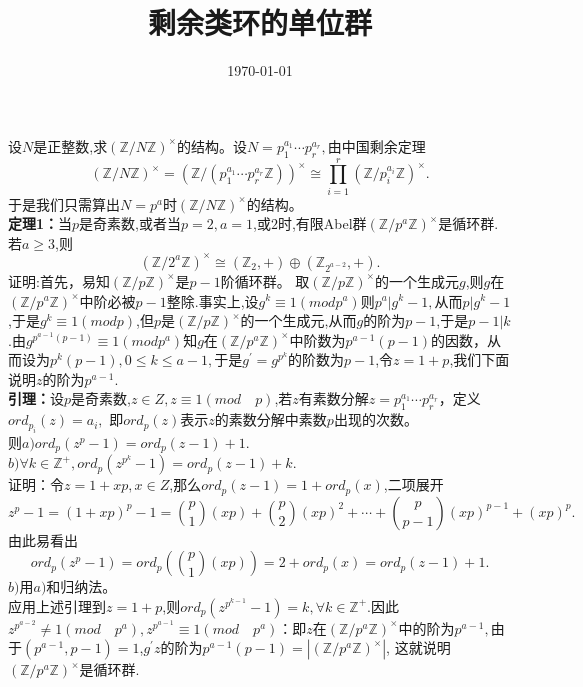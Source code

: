 \documentclass[UTF8]{article}
\title{剩余类环的单位群}
\date{\today }
\begin{document}
 \maketitle
	设$N$是正整数,求$(\mathbb{Z}/N\mathbb{Z})^{\times}$的结构。设$N=p_{1}^{a_{1}}\cdots p_{r}^{a_{r}},$由中国剩余定理
	$$
	(\mathbb{Z}/N\mathbb{Z})^{\times}=(\mathbb{Z}/(p_{1}^{a_{1}}\cdots p_{r}^{a_{r}}\mathbb{Z}))^{\times}\cong \prod_{i=1}^{r}(\mathbb{Z}/p_{i}^{a_{i}}\mathbb{Z})^{\times}.
	$$
	于是我们只需算出$N=p^{a}$时$(\mathbb{Z}/N\mathbb{Z})^{\times}$的结构。\\
	\textbf{定理1：}当$p$是奇素数,或者当$p=2,a=1$,或$2$时,有限Abel群$(\mathbb{Z}/p^{a}\mathbb{Z})^{\times}$是循环群.若$a\geq 3$,则
	$$
	(\mathbb{Z}/2^{a}\mathbb{Z})^{\times}\cong (\mathbb{Z}_{2},+)\oplus (\mathbb{Z}_{2^{a-2}},+).
	$$
	证明:首先，易知$(\mathbb{Z}/p\mathbb{Z})^{\times}$是$p-1$阶循环群。 取$(\mathbb{Z}/p\mathbb{Z})^{\times}$的一个生成元$g$,则$g$在$(\mathbb{Z}/p^{a}\mathbb{Z})^{\times}$中阶必被$p-1$整除.事实上,设$g^{k}\equiv 1(mod p^{a})$则$p^{a}|g^{k}-1,$从而$p|g^{k}-1$,于是$g^{k}\equiv 1(mod p)$,但$p$是$(\mathbb{Z}/p\mathbb{Z})^{\times}$的一个生成元,从而$g$的阶为$p-1$,于是$p-1|k$.由$g^{p^{a-1}(p-1)}\equiv 1(mod p^{a})$知$g$在$(\mathbb{Z}/p^{a}\mathbb{Z})^{\times}$中阶数为$p^{a-1}(p-1)$的因数，从而设为$p^{k}(p-1),0\leq k\leq a-1,$于是$g^{'}=g^{p^{k}}$的阶数为$p-1$,令$z=1+p$,我们下面说明$z$的阶为$p^{a-1}.$\\
	\textbf{引理：}设$p$是奇素数,$z\in Z,z\equiv 1(mod\quad p)$,若$z$有素数分解$z=p_{1}^{a_{1}}\cdots p_{r}^{a_{r}}$，定义$ord_{p_{i}}(z)=a_{i},$
	即$ord_{p}(z)$表示$z$的素数分解中素数$p$出现的次数。\\
	则$a)ord_{p}(z^{p}-1)=ord_{p}(z-1)+1.$\\
	 $b)\forall k\in \mathbb{Z}^{+},ord_{p}(z^{p^{k}}-1)=ord_{p}(z-1)+k$.\\ 
	证明：令$z=1+xp,x\in Z$,那么$ord_{p}(z-1)=1+ord_{p}(x)$,二项展开
	$$
	z^{p}-1=(1+xp)^{p}-1=\binom{p}{1}(xp)+\binom{p}{2}(xp)^{2}+\cdots+\binom{p}{p-1}(xp)^{p-1}+(xp)^{p}.
	$$
	由此易看出
	$$
	ord_{p}(z^{p}-1)=ord_{p}(\binom{p}{1}(xp))=2+ord_{p}(x)=ord_{p}(z-1)+1.
	$$
$b)$用$a)$和归纳法。\\
 应用上述引理到$z=1+p$,则$ord_{p}(z^{p^{k-1}}-1)=k,\forall k\in \mathbb{Z}^{+}.$因此$z^{p^{a-2}}\neq 1(mod \quad p^{a}),z^{p^{a-1}}\equiv 1(mod\quad p^{a})$：即$z$在$(\mathbb{Z}/p^{a}\mathbb{Z})^{\times}$中的阶为$p^{a-1},$由于$(p^{a-1},p-1)=1$,$g^{'}z$的阶为$p^{a-1}(p-1)=|(\mathbb{Z}/p^{a}\mathbb{Z})^{\times}|$,	这就说明$(\mathbb{Z}/p^{a}\mathbb{Z})^{\times}$是循环群.\\
\end{document}
